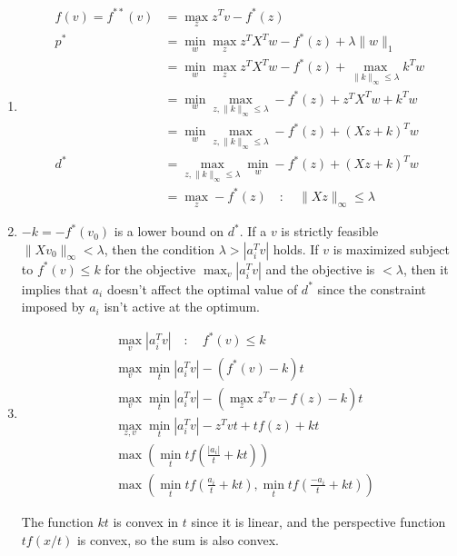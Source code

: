 \documentclass[11pt]{article}
\begin{document}
\begin{solution}
\begin{enumerate}
    \item
        \begin{align*}
            f(v) = f^{**}(v) &= \max_z z^T v - f^*(z) \\
            p^* &= \min_w \max_z z^T X^T w - f^*(z) + \lambda \|w\|_1 \\
            &= \min_w \max_z z^T X^T w - f^*(z) + \max_{\|k\|_{\infty} \leq \lambda} k^T w \\
            &= \min_w \max_{z, \|k\|_{\infty} \leq \lambda} - f^*(z) + z^T X^T w + k^T w \\
            &= \min_w \max_{z, \|k\|_{\infty} \leq \lambda} - f^*(z) + (Xz + k)^T w \\
            d^* &= \max_{z, \|k\|_{\infty} \leq \lambda} \min_w - f^*(z) + (Xz + k)^T w \\
            &= \max_{z} -f^*(z) \quad : \quad \|Xz\|_{\infty} \leq \lambda
        \end{align*}

    \item $-k = -f^*(v_0)$ is a lower bound on $d^*$. If a $v$ is strictly feasible $\|X v_0\|_{\infty} < \lambda$, then the condition $\lambda > |a_i^T v|$ holds. If $v$ is maximized subject to $f^*(v) \leq k$ for the objective $\max_v |a_i^T v|$ and the objective is $< \lambda$, then it implies that $a_i$ doesn't affect the optimal value of $d^*$ since the constraint imposed by $a_i$ isn't active at the optimum.

    \item
        \begin{align*}
            &\max_v |a_i^T v| \quad : \quad f^*(v) \leq k \\
            &\max_v \min_t |a_i^T v| - (f^*(v) - k)t \\
            &\max_v \min_t |a_i^T v| - (\max_z z^T v - f(z) - k)t \\
            &\max_{z,v} \min_t |a_i^T v| - z^T v t + t f(z) + kt \\
            &\max (\min_t t f(\frac{|a_i|}{t} + kt)) \\
            &\max (\min_t t f(\frac{a_i}{t} + kt), \min_t t f(\frac{-a_i}{t} + kt))
        \end{align*}

    The function $kt$ is convex in $t$ since it is linear, and the perspective function $t f(x/t)$ is convex, so the sum is also convex.
\end{enumerate}
\end{solution}
\end{document}
